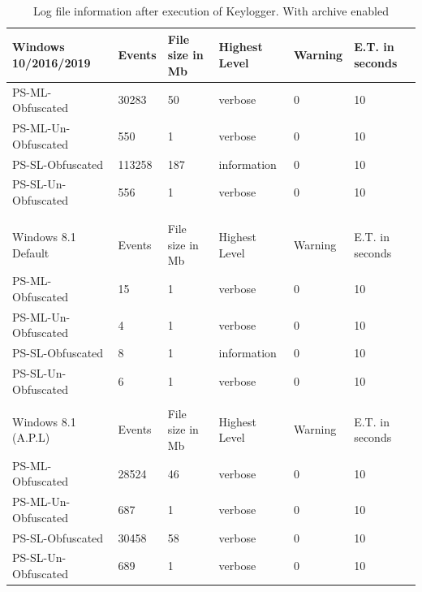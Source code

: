 \documentclass{article}%
\begin{document}
\begin{table}
\begin{center}
\caption {Log file information after execution of Keylogger. With archive enabled} \label{tab:table_seven}
\begin{tabular}{|l|l|l|l|l|l|}\hline
Windows 10/2016/2019 & Events & File size in Mb & Highest Level & Warning & E.T. in seconds  \\\hline
PS-ML-Obfuscated     & 30283  & 50              & verbose       & 0       & 10               \\\hline
PS-ML-Un-Obfuscated  & 550    & 1               & verbose       & 0       & 10               \\\hline
PS-SL-Obfuscated     & 113258 & 187             & information   & 0       & 10               \\\hline
PS-SL-Un-Obfuscated  & 556    & 1               & verbose       & 0       & 10               \\\hline
                     &        &                 &               &         &                  \\\hline
                     &        &                 &               &         &                  \\\hline
Windows 8.1 Default  & Events & File size in Mb & Highest Level & Warning & E.T. in seconds  \\\hline
PS-ML-Obfuscated     & 15     & 1               & verbose       & 0       & 10               \\\hline
PS-ML-Un-Obfuscated  & 4      & 1               & verbose       & 0       & 10               \\\hline
PS-SL-Obfuscated     & 8      & 1               & information   & 0       & 10               \\\hline
PS-SL-Un-Obfuscated  & 6      & 1               & verbose       & 0       & 10               \\\hline
                     &        &                 &               &         &                  \\\hline
Windows 8.1 (A.P.L)  & Events & File size in Mb & Highest Level & Warning & E.T. in seconds  \\\hline
PS-ML-Obfuscated     & 28524  & 46              & verbose       & 0       & 10               \\\hline
PS-ML-Un-Obfuscated  & 687    & 1               & verbose       & 0       & 10               \\\hline
PS-SL-Obfuscated     & 30458  & 58              & verbose       & 0       & 10               \\\hline
PS-SL-Un-Obfuscated  & 689    & 1               & verbose       & 0       & 10               \\\hline
\end{tabular}
\end{center}
\end{table}
\end{document}
